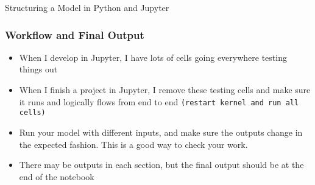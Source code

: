 \documentclass[handout, 11pt]{beamer}
\begin{document}
\begin{section}{Structuring a Model in Python and Jupyter}
\begin{frame}
\begin{itemize}
\end{itemize}
\end{frame}
\begin{frame}
\frametitle{Workflow and Final Output}
\begin{itemize}
\item When I develop in Jupyter, I have lots of cells going everywhere testing things out
\vfill
\item When I finish a project in Jupyter, I remove these testing cells and make sure it runs and logically flows from end to end
\texttt{(restart kernel and run all cells)}
\vfill
\item Run your model with different inputs, and make sure the outputs change in the expected fashion. This is a good way to check your work.
\vfill
\item There may be outputs in each section, but the final output should be at the end of the notebook
\end{itemize}
\end{frame}
\end{section}
\end{document}
